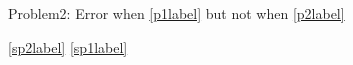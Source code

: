 Problem2: Error when \ref{p1label} but not when \ref{p2label}

\ref{sp2label}
\ref{sp1label}
\label{sp1label}
